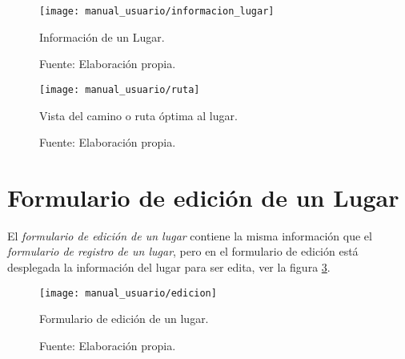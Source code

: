\begin{figure}[H]
      \begin{center}
        \texttt{[image: manual\_usuario/informacion\_lugar]}

        \caption{Información de un Lugar.}
        \label{fig:vista_informacion_lugar}
        \caption*{Fuente: Elaboración propia.}
      \end{center}
\end{figure}


\begin{figure}[H]
      \begin{center}
        \texttt{[image: manual\_usuario/ruta]}

        \caption{Vista del camino o ruta óptima al lugar.}
        \label{fig:vista_ruta}
        \caption*{Fuente: Elaboración propia.}
      \end{center}
\end{figure}


%
%


\section{Formulario de edición de un Lugar}

El \emph{formulario de edición de un lugar} contiene la misma información que el \emph{formulario de registro de un lugar}, pero en el formulario de edición está desplegada la información del lugar para ser edita, ver la figura \ref{fig:vista_edicion_lugar}.

\begin{figure}[H]
      \begin{center}
        \texttt{[image: manual\_usuario/edicion]}

        \caption{Formulario de edición de un lugar.}
        \label{fig:vista_edicion_lugar}
        \caption*{Fuente: Elaboración propia.}
      \end{center}
\end{figure}



